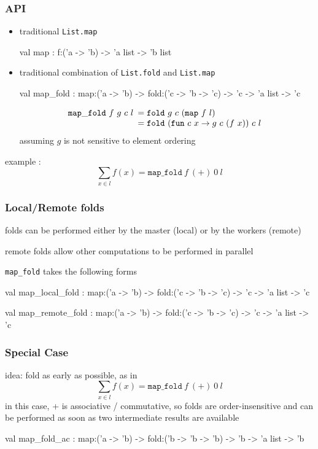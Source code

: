 \documentclass{beamer}
\let\emph\alert
\begin{document}
\begin{frame}\frametitle{API}
  \begin{itemize}
  \item traditional \texttt{List.map}
\begin{ocaml}
 val map : 
  f:('a -> 'b) -> 'a list -> 'b list
\end{ocaml}

    \bigskip
  \item traditional combination of \texttt{List.fold} and \texttt{List.map}
  
\begin{ocaml}
 val map_fold :
   map:('a -> 'b) -> fold:('c -> 'b -> 'c) -> 
   'c -> 'a list -> 'c
\end{ocaml}
    \begin{displaymath}
      \mathtt{map\_fold}~f~g~c~l
      \begin{array}[t]{l}
        = \mathtt{fold}~g~c~(\mathtt{map}~f~l) \\
        = \mathtt{fold}~(\mathtt{fun}~c~x\rightarrow g~c~(f~x))~c~l\\
      \end{array}
    \end{displaymath}
    assuming $g$ is not sensitive to element ordering
  \end{itemize}

  example :
  \begin{displaymath}
    \sum_{x\in l}f(x) = \mathtt{map\_fold}~f~(+)~0~l
  \end{displaymath}
\end{frame}

\begin{frame}\frametitle{Local/Remote folds}
  folds can be performed either by the master (local) or by the
  workers (remote)

  \bigskip
  remote folds allow other computations to be performed in parallel


  \texttt{map\_fold} takes the following forms
  \begin{ocaml}
val map_local_fold :
  map:('a -> 'b) -> fold:('c -> 'b -> 'c) -> 
  'c -> 'a list -> 'c

val map_remote_fold :
  map:('a -> 'b) -> fold:('c -> 'b -> 'c) -> 
  'c -> 'a list -> 'c
  \end{ocaml}
\end{frame}

\begin{frame}\frametitle{Special Case}
  \emph{idea}: fold as early as possible, as in
  \begin{displaymath}
    \sum_{x\in l}f(x) = \mathtt{map\_fold}~f~(+)~0~l
  \end{displaymath}
  in this case, + is \emph{associative / commutative}, so folds are
  order-insensitive and can be performed as soon as two intermediate
  results are available


  \begin{ocaml}
val map_fold_ac :
  map:('a -> 'b) -> fold:('b -> 'b -> 'b) -> 
  'b -> 'a list -> 'b
  \end{ocaml}
\end{frame}
\end{document}
